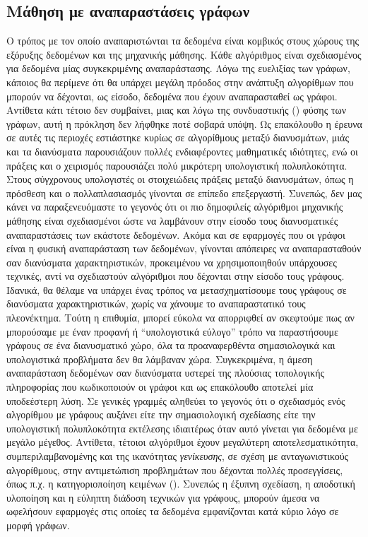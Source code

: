\subsection{Μάθηση με αναπαραστάσεις γράφων}
Ο τρόπος με τον οποίο αναπαριστώνται τα δεδομένα είναι κομβικός στους χώρους της εξόρυξης δεδομένων και της μηχανικής μάθησης.
Κάθε αλγόριθμος είναι σχεδιασμένος για δεδομένα μίας συγκεκριμένης αναπαράστασης.
Λόγω της ευελιξίας των γράφων, κάποιος θα περίμενε ότι θα υπάρχει μεγάλη πρόοδος στην ανάπτυξη αλγορίθμων που μπορούν να δέχονται, ως είσοδο, δεδομένα που έχουν αναπαρασταθεί ως γράφοι.
Αντίθετα κάτι τέτοιο δεν συμβαίνει, μιας και λόγω της συνδυαστικής () φύσης των γράφων, αυτή η πρόκληση δεν λήφθηκε ποτέ σοβαρά υπόψη.
Ως επακόλουθο η έρευνα σε αυτές τις περιοχές εστιάστηκε κυρίως σε αλγορίθμους μεταξύ διανυσμάτων, μιάς και τα διανύσματα παρουσιάζουν πολλές ενδιαφέροντες μαθηματικές ιδιότητες, ενώ οι πράξεις και ο χειρισμός παρουσιάζει πολύ μικρότερη υπολογιστική πολυπλοκότητα. Στους σύγχρονους υπολογιστές οι στοιχειώδεις πράξεις μεταξύ διανυσμάτων, όπως η πρόσθεση και ο πολλαπλασιασμός γίνονται σε επίπεδο επεξεργαστή.
Συνεπώς, δεν μας κάνει να παραξενευόμαστε το γεγονός ότι οι πιο δημοφιλείς αλγόριθμοι μηχανικής μάθησης είναι σχεδιασμένοι ώστε να λαμβάνουν στην είσοδο τους διανυσματικές αναπαραστάσεις των εκάστοτε δεδομένων. 
Ακόμα και σε εφαρμογές που οι γράφοι είναι η φυσική αναπαράσταση των δεδομένων, γίνονται απόπειρες να αναπαρασταθούν σαν διανύσματα χαρακτηριστικών, προκειμένου να χρησιμοποιηθούν υπάρχουσες τεχνικές, αντί να σχεδιαστούν αλγόριθμοι που δέχονται στην είσοδο τους γράφους.
Ιδανικά, θα θέλαμε να υπάρχει ένας τρόπος να μετασχηματίσουμε τους γράφους σε διανύσματα χαρακτηριστικών, χωρίς να χάνουμε το αναπαραστατικό τους πλεονέκτημα.
Τούτη η επιθυμία, μπορεί εύκολα να απορριφθεί αν σκεφτούμε πως αν μπορούσαμε με έναν προφανή ή ``υπολογιστικά εύλογο'' τρόπο να παραστήσουμε γράφους σε ένα διανυσματικό χώρο, όλα τα προαναφερθέντα σημασιολογικά και υπολογιστικά προβλήματα δεν θα λάμβαναν χώρα.
Συγκεκριμένα, η άμεση αναπαράσταση δεδομένων σαν διανύσματα υστερεί της πλούσιας τοπολογικής πληροφορίας που κωδικοποιούν οι γράφοι και ως επακόλουθο αποτελεί μία υποδεέστερη λύση.
Σε γενικές γραμμές αληθεύει το γεγονός ότι ο σχεδιασμός ενός αλγορίθμου με γράφους αυξάνει είτε την σημασιολογική σχεδίασης είτε την υπολογιστική πολυπλοκότητα εκτέλεσης ιδιαιτέρως όταν αυτό γίνεται για δεδομένα με μεγάλο μέγεθος.
Αντίθετα, τέτοιοι αλγόριθμοι έχουν μεγαλύτερη αποτελεσματικότητα, συμπεριλαμβανομένης και της ικανότητας \textit{γενίκευσης}, σε σχέση με ανταγωνιστικούς αλγορίθμους, στην αντιμετώπιση προβλημάτων που δέχονται πολλές προσεγγίσεις, όπως π.χ. η κατηγοριοποίηση κειμένων ().
Συνεπώς η έξυπνη σχεδίαση, η αποδοτική υλοποίηση και η εύληπτη διάδοση τεχνικών για γράφους, μπορούν άμεσα να ωφελήσουν εφαρμογές στις οποίες τα δεδομένα εμφανίζονται κατά κύριο λόγο σε μορφή γράφων.
